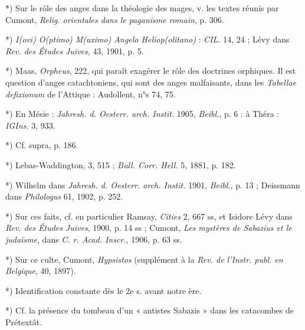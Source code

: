 \documentclass[a4paper, 11pt, oneside, polutonikogreek, french]{article}
\begin{document}
*) Sur le rôle des anges dans la théologie des mages, v. les textes réunis par Cumont, \emph{Relig. orientales dans le paganisme romain}, p. 306.

*) \emph{I(ovi) O(ptimo) M(aximo) Angelo Heliop(olitano)} : \emph{CIL.} 14, 24 ; Lévy dans \emph{Rev. des Études Juives}, 43, 1901, p. 5.

*) Maas, \emph{Orpheus}, 222, qui paraît exagérer le rôle des doctrines orphiques. Il est question d'anges catachtoniens, qui sont des anges malfaisants, dans les \emph{Tabellae defixionum} de l'Attique : Audollent, n°s 74, 75.

*) En Mésie : \emph{Jahresh. d. Oesterr. arch. Instit.} 1905, \emph{Beibl.}, p. 6 : à Théra : \emph{IGIns.} 3, 933.

*) Cf. supra, p. 186.

*) Lebas-Waddington, 3, 515 ; \emph{Bull. Corr. Hell.} 5, 1881, p. 182.

*) Wilhelm dans \emph{Jahresh. d. Oesterr. arch. Instit.} 1901, \emph{Beibl.}, p. 13 ; Deissmann dans \emph{Philologus} 61, 1902, p. 252.

*) Sur ces faits, cf. en particulier Ramsay, \emph{Cities} 2, 667 ss, et Isidore Lévy dans \emph{Rev. des Études Juives}, 1900, p. 14 ss ; Cumont, \emph{Les mystères de Sabazius et le judaïsme}, dans \emph{C. r. Acad. Inscr.}, 1906, p. 63 ss.

*) Sur ce culte, Cumont, \emph{Hypsistos} (supplément à la \emph{Rev. de l'Instr. publ. en Belgique}, 40, 1897).

*) Identification constante dès le 2e s. avant notre ère.

*) Cf. la présence du tombeau d'un « antistes Sabazis » dans les catacombes de Prétextât.
\end{document}
